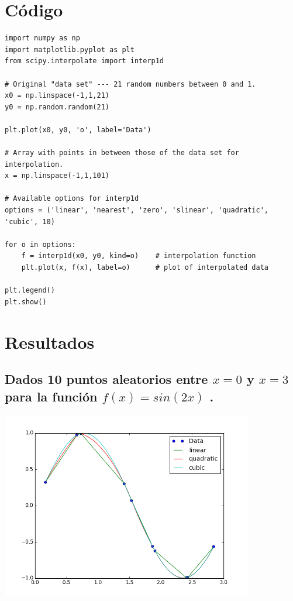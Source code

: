 \documentclass[a4paper]{article}
\begin{document}
\section{Código}
\begin{verbatim}
import numpy as np
import matplotlib.pyplot as plt
from scipy.interpolate import interp1d

# Original "data set" --- 21 random numbers between 0 and 1.
x0 = np.linspace(-1,1,21)
y0 = np.random.random(21)

plt.plot(x0, y0, 'o', label='Data')

# Array with points in between those of the data set for interpolation.
x = np.linspace(-1,1,101)

# Available options for interp1d
options = ('linear', 'nearest', 'zero', 'slinear', 'quadratic', 'cubic', 10)

for o in options:
    f = interp1d(x0, y0, kind=o)    # interpolation function
    plt.plot(x, f(x), label=o)      # plot of interpolated data

plt.legend()
plt.show()
\end{verbatim}

\section{Resultados}
	\subsection{Dados 10 puntos aleatorios entre $x=0$ y $x=3$ para la función $f(x) = sin(2 x)$ .}
\includegraphics[width=11cm]{figure_1}
\\
\end{document}
